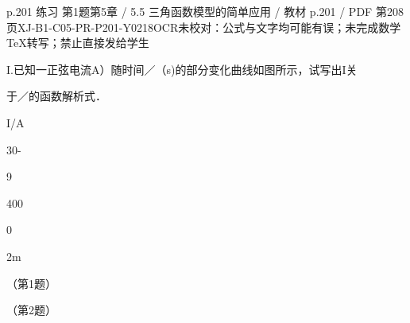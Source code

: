\begin{bankitem}{p.201 练习 第1题}{第5章 / 5.5 三角函数模型的简单应用 / 教材 p.201 / PDF 第208页}{XJ-B1-C05-PR-P201-Y0218}{OCR未校对：公式与文字均可能有误；未完成数学TeX转写；禁止直接发给学生}
\begin{ocrdraft}
\par
I.已知一正弦电流A）随时间／（s)的部分变化曲线如图所示，试写出I关
\par
于／的函数解析式．
\par
I/A
\par
30-
\par
9
\par
400
\par
0
\par
2m
\par
（第1题）
\par
（第2题）
\end{ocrdraft}
\end{bankitem}
